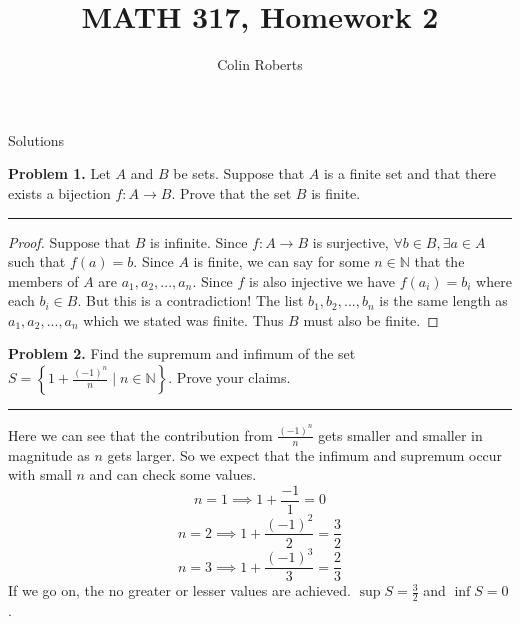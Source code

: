 \documentclass[leqno]{article}
\author{Colin Roberts}
\title{MATH 317, Homework 2}
\theoremstyle{nonumberplain}
\newtheorem{proof}{Proof}
\begin{document}
\maketitle
\begin{large}
\begin{center}
Solutions
\end{center}
\end{large}
\pagebreak

\noindent\textbf{Problem 1.} Let $A$ and $B$ be sets. Suppose that $A$ is a finite set and that there exists a bijection $f \colon A \to B$. Prove that the set $B$ is finite.

\noindent\rule[0.5ex]{\linewidth}{1pt}

\begin{proof}
Suppose that $B$ is infinite.  Since $f \colon A\to B$ is surjective, $\forall b \in B, \exists a \in A $ such that $f(a)=b$.  Since $A$ is finite, we can say for some $n\in \mathbb{N}$ that the members of $A$ are $a_1, a_2, ... , a_n$.  Since $f$ is also injective we have $f(a_i)=b_i$ where each $b_i \in B$.  But this is a contradiction!  The list $b_1, b_2, ..., b_n$ is the same length as $a_1,a_2, ..., a_n$ which we stated was finite.  Thus $B$ must also be finite.
\end{proof}

\pagebreak



\noindent\textbf{Problem 2.} Find the supremum and infimum of the set $S= \left\{1+ \frac{(-1)^n}{n} \mid n\in \mathbb{N}\right\}$. Prove your claims.

\noindent\rule[0.5ex]{\linewidth}{1pt}

Here we can see that the contribution from $\frac{(-1)^n}{n}$ gets smaller and smaller in magnitude as $n$ gets larger.  So we expect that the infimum and supremum occur with small $n$ and can check some values. 
\[
n=1 \implies 1+\frac{-1}{1}=0 
\]
\[
n=2 \implies 1 + \frac{(-1)^2}{2}=\frac{3}{2}
\]
\[
n=3 \implies 1+ \frac{(-1)^3}{3}=\frac{2}{3}
\]
If we go on, the no greater or lesser values are achieved.  $\sup S = \frac{3}{2}$ and $\inf S = 0$.  
\end{document}
